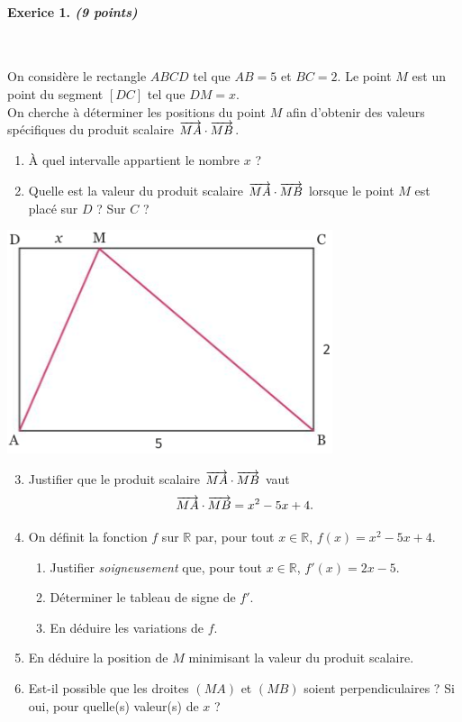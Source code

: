 \documentclass[11pt]{article}
\begin{document}
\paragraph{Exerice 1. \emph{(9 points)}}~\\ %
\begin{minipage}{.5\textwidth}
  On considère le rectangle $ABCD$ tel que $AB=5$ et $BC=2$. Le point $M$ est un
  point du segment $\left[ DC \right]$ tel que $DM=x$.\\
  On cherche à déterminer les positions du point $M$ afin d'obtenir des valeurs
  spécifiques du produit scalaire $\overrightarrow{MA}\cdot\overrightarrow{MB}$.
  \begin{enumerate}
    \item À quel intervalle appartient le nombre $x$ ?
    \item Quelle est la valeur du produit scalaire
      $\overrightarrow{MA}\cdot\overrightarrow{MB}$ lorsque le point $M$ est placé sur $D$ ? Sur $C$
      ?
  \end{enumerate}
\end{minipage}
\begin{minipage}{.5\textwidth}
  \begin{center}
    \includegraphics[scale=.6]{ps.png}
  \end{center}
\end{minipage}
\begin{enumerate}
    \setcounter{enumi}{2}
  \item Justifier que le produit scalaire $\overrightarrow{MA}\cdot\overrightarrow{MB}$ vaut
    \[
      \overrightarrow{MA}\cdot\overrightarrow{MB} = x^2 - 5x + 4.
    \]
  \item On définit la fonction $f$ sur $\mathbb{R}$ par, pour tout
    $x\in\mathbb{R}$, $f(x) = x^2 - 5x + 4$.
    \begin{enumerate}
      \item Justifier \emph{soigneusement} que, pour tout $x\in\mathbb{R}$, $f'(x) = 2x-5$.
      \item Déterminer le tableau de signe de $f'$.
      \item En déduire les variations de $f$.
    \end{enumerate}
  \item En déduire la position de $M$ minimisant la valeur du produit scalaire.
  \item Est-il possible que les droites $\left( MA \right)$ et $\left( MB
    \right)$ soient perpendiculaires ? Si oui, pour quelle(s) valeur(s) de $x$ ?
\end{enumerate}
\end{document}
